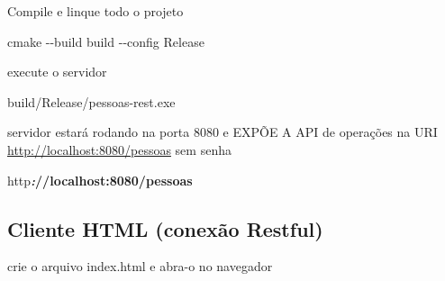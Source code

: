 \documentclass[
]{book}
\newenvironment{Shaded}{\begin{snugshade}}{\end{snugshade}}
\newcommand{\AttributeTok}[1]{\textcolor[rgb]{0.13,0.29,0.53}{#1}}
\newcommand{\ErrorTok}[1]{\textcolor[rgb]{0.64,0.00,0.00}{\textbf{#1}}}
\newcommand{\InformationTok}[1]{\textcolor[rgb]{0.56,0.35,0.01}{\textbf{\textit{#1}}}}
\newcommand{\NormalTok}[1]{#1}
\begin{document}
Compile e linque todo o projeto

\begin{Shaded}
\begin{Highlighting}[]
\NormalTok{cmake {-}}\AttributeTok{{-}build}\NormalTok{ build {-}}\AttributeTok{{-}config}\NormalTok{ Release}
\end{Highlighting}
\end{Shaded}

execute o servidor

\begin{Shaded}
\begin{Highlighting}[]
\NormalTok{build/Release/pessoas{-}rest.exe}
\end{Highlighting}
\end{Shaded}

servidor estará rodando na porta 8080 e EXPÕE A API de operações na URI \url{http://localhost:8080/pessoas} sem senha

\begin{Shaded}
\begin{Highlighting}[]
\NormalTok{http}\InformationTok{:}\ErrorTok{//localhost:8080/pessoas}
\end{Highlighting}
\end{Shaded}

\subsection{Cliente HTML (conexão Restful)}\label{cliente-html-conexuxe3o-restful-2}

crie o arquivo index.html e abra-o no navegador
\end{document}
